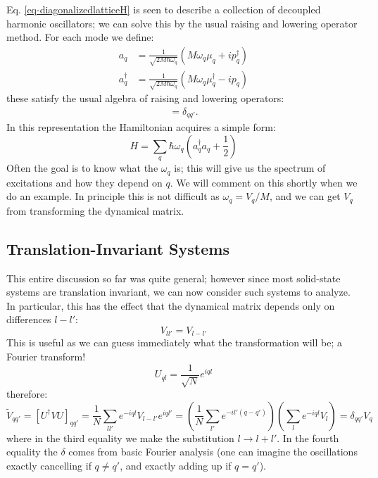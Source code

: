Eq. \eqref{eq-diagonalizedlatticeH} is seen to describe a collection of decoupled harmonic oscillators; we can solve this by the usual raising and lowering operator method. For each mode we define:
\begin{equation}\label{eq-raisinglowering}
    \begin{split}
        a_q &= \frac{1}{\sqrt{2M\hbar \omega_q}}\left(M\omega_q \mu_q + ip_q^\dag\right)
        \\ a_q^\dag &= \frac{1}{\sqrt{2M\hbar \omega_q}}\left(M\omega_q \mu_q^\dag - ip_q\right)
    \end{split}
\end{equation}
these satisfy the usual algebra of raising and lowering operators:
\begin{align*}
    [a_q, a_q^\dag] = \delta_{qq'}.
\end{align*}
In this representation the Hamiltonian acquires a simple form:
\begin{equation}
    H = \sum_q \hbar \omega_q\left(a^\dag_q a_q + \frac{1}{2}\right)
\end{equation}
Often the goal is to know what the $\omega_q$ is; this will give us the spectrum of excitations and how they depend on $q$. We will comment on this shortly when we do an example. In principle this is not difficult as $\omega_q = V_q/M$, and we can get $V_q$ from transforming the dynamical matrix. 

\subsection{Translation-Invariant Systems}
This entire discussion so far was quite general; however since most solid-state systems are translation invariant, we can now consider such systems to analyze. In particular, this has the effect that the dynamical matrix depends only on differences $l - l'$:
\begin{equation}
    V_{ll'} = V_{l-l'}
\end{equation}
This is useful as we can guess immediately what the transformation will be; a Fourier transform!
\begin{equation}
    U_{ql} = \frac{1}{\sqrt{N}}e^{iql}
\end{equation}
therefore:
\begin{equation}
    \tilde{V}_{qq'} = [U^\dag VU]_{qq'} = \frac{1}{N}\sum_{ll'}e^{-iql}V_{l-l'}e^{iql'} = \left(\frac{1}{N}\sum_{l'}e^{-il'(q-q')}\right)\left(\sum_{l}e^{-iql}V_l\right) = \delta_{qq'}V_q
\end{equation}
where in the third equality we make the substitution $l \to l + l'$. In the fourth equality the $\delta$ comes from basic Fourier analysis (one can imagine the oscillations exactly cancelling if $q \neq q'$, and exactly adding up if $q = q'$).

